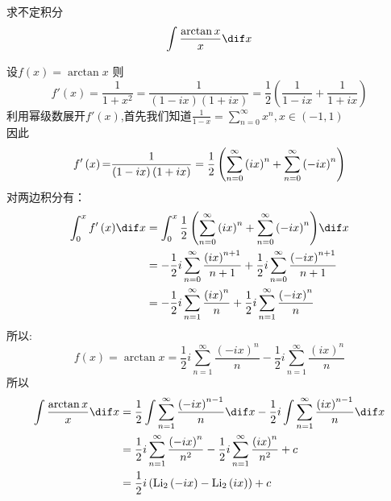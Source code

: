 \documentclass[color=green,titlestyle=hang]{elegantbook}%
\begin{document}
\begin{exercise}求不定积分\[\int\frac{\arctan x}{x} \dif x\]
\end{exercise}\begin{Solution}设$\displaystyle f\left( x \right) = \arctan x$
则\[ f'\left( x \right) = \frac{1}{{1 + {x^2}}} = \frac{1}{{\left( {1 - ix} \right)\left( {1 + ix} \right)}} = \frac{1}{2}\left( {\frac{1}{{1 - ix}} + \frac{1}{{1 + ix}}} \right)\]
利用幂级数展开$\displaystyle f'(x)$,首先我们知道$\displaystyle \frac{1}{{1 - x}} = \sum\limits_{n = 0}^\infty  {{x^n}} ,x \in ( - 1,1)$\\
因此\[ f'\left( x \right){\rm{ = }}\frac{1}{{\left( {1 - ix} \right)\left( {1 + ix} \right)}} = \frac{1}{2}\left( {\sum\limits_{n = 0}^\infty  {{{\left( {ix} \right)}^n}}  + \sum\limits_{n = 0}^\infty  {{{\left( { - ix} \right)}^n}} } \right)\]
对两边积分有：\begin{align*}
\int_0^x {f'\left( x \right)} \dif x &= \int_0^x {\frac{1}{2}\left( {\sum\limits_{n = 0}^\infty  {{{\left( {ix} \right)}^n}}  + \sum\limits_{n = 0}^\infty  {{{\left( { - ix} \right)}^n}} } \right)} \dif x\\
&=  - \frac{1}{2}i\sum\limits_{n = 0}^\infty  {\frac{{{{\left( {ix} \right)}^{n + 1}}}}{{n + 1}}}  + \frac{1}{2}i\sum\limits_{n = 0}^\infty  {\frac{{{{\left( { - ix} \right)}^{n + 1}}}}{{n + 1}}} \\
&=  - \frac{1}{2}i\sum\limits_{n = 1}^\infty  {\frac{{{{\left( {ix} \right)}^n}}}{n}}  + \frac{1}{2}i\sum\limits_{n = 1}^\infty  {\frac{{{{\left( { - ix} \right)}^n}}}{n}}
\end{align*}
所以:\[ f\left( x \right) = \arctan x = \frac{1}{2}i\sum\limits_{n = 1}^\infty  {\frac{{{{\left( { - ix} \right)}^n}}}{n}}  - \frac{1}{2}i\sum\limits_{n = 1}^\infty  {\frac{{{{\left( {ix} \right)}^n}}}{n}} \]
所以\begin{align*}
\int {\frac{{\arctan x}}{x}} \dif x &= \frac{1}{2}\int {\sum\limits_{n = 1}^\infty  {\frac{{{{\left( { - ix} \right)}^{n - 1}}}}{n}} } \dif x - \frac{1}{2}i\int {\sum\limits_{n = 1}^\infty  {\frac{{{{\left( {ix} \right)}^{n - 1}}}}{n}} } \dif x\\
&= \frac{1}{2}i\sum\limits_{n = 1}^\infty  {\frac{{{{\left( { - ix} \right)}^n}}}{{{n^2}}}}  - \frac{1}{2}i\sum\limits_{n = 1}^\infty  {\frac{{{{\left( {ix} \right)}^n}}}{{{n^2}}}}  + c\\
&= \frac{1}{2}i\left({\textrm{Li}_2\left( { - ix} \right) - {\textrm{Li}_2}\left( {ix} \right)} \right) + c
\end{align*}
\end{Solution}
\end{document}
